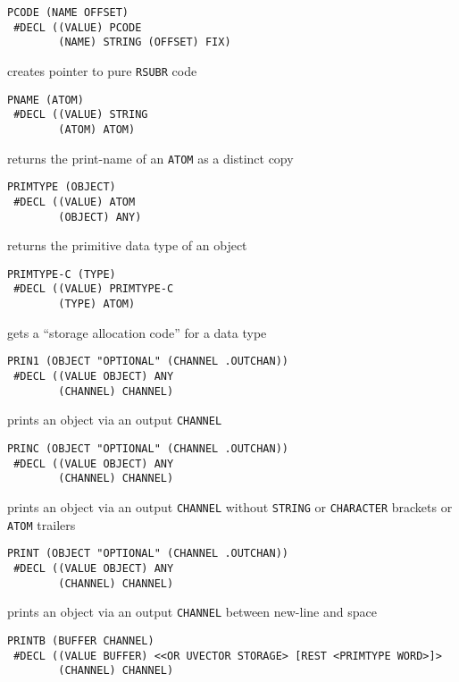 \documentclass[a4paper]{scrbook}
\begin{document}
\begin{verbatim}
PCODE (NAME OFFSET)
 #DECL ((VALUE) PCODE
        (NAME) STRING (OFFSET) FIX)
\end{verbatim}

creates pointer to pure \texttt{RSUBR} code

\begin{verbatim}
PNAME (ATOM)
 #DECL ((VALUE) STRING
        (ATOM) ATOM)
\end{verbatim}

returns the print-name of an \texttt{ATOM} as a distinct copy

\begin{verbatim}
PRIMTYPE (OBJECT)
 #DECL ((VALUE) ATOM
        (OBJECT) ANY)
\end{verbatim}

returns the primitive data type of an object

\begin{verbatim}
PRIMTYPE-C (TYPE)
 #DECL ((VALUE) PRIMTYPE-C
        (TYPE) ATOM)
\end{verbatim}

gets a ``storage allocation code'' for a data type

\begin{verbatim}
PRIN1 (OBJECT "OPTIONAL" (CHANNEL .OUTCHAN))
 #DECL ((VALUE OBJECT) ANY
        (CHANNEL) CHANNEL)
\end{verbatim}

prints an object via an output \texttt{CHANNEL}

\begin{verbatim}
PRINC (OBJECT "OPTIONAL" (CHANNEL .OUTCHAN))
 #DECL ((VALUE OBJECT) ANY
        (CHANNEL) CHANNEL)
\end{verbatim}

prints an object via an output \texttt{CHANNEL} without \texttt{STRING} or \texttt{CHARACTER} brackets or \texttt{ATOM}
trailers

\begin{verbatim}
PRINT (OBJECT "OPTIONAL" (CHANNEL .OUTCHAN))
 #DECL ((VALUE OBJECT) ANY
        (CHANNEL) CHANNEL)
\end{verbatim}

prints an object via an output \texttt{CHANNEL} between new-line and space

\begin{verbatim}
PRINTB (BUFFER CHANNEL)
 #DECL ((VALUE BUFFER) <<OR UVECTOR STORAGE> [REST <PRIMTYPE WORD>]>
        (CHANNEL) CHANNEL)
\end{verbatim}
\end{document}
